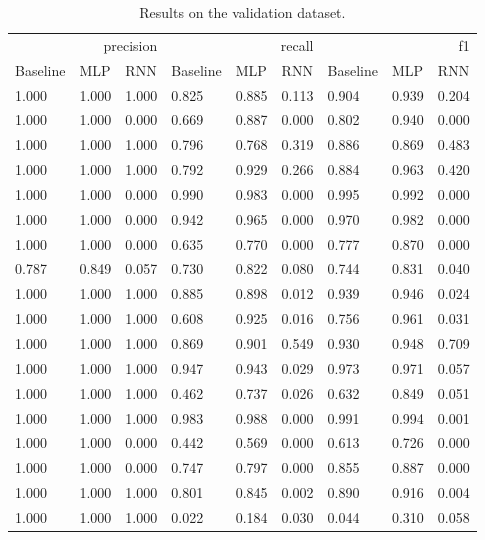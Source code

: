 \begin{table}
\caption{Results on the validation dataset.}
\label{tab::ex_2_valid}
\begin{tabular}{|l||l||l||l||l||l||l||l||l|}
\toprule
\multicolumn{3}{r}{precision} & \multicolumn{3}{r}{recall} & \multicolumn{3}{r}{f1} \\
Baseline & MLP & RNN & Baseline & MLP & RNN & Baseline & MLP & RNN \\
\midrule
1.000 & 1.000 & 1.000 & 0.825 & 0.885 & 0.113 & 0.904 & 0.939 & 0.204 \\
1.000 & 1.000 & 0.000 & 0.669 & 0.887 & 0.000 & 0.802 & 0.940 & 0.000 \\
1.000 & 1.000 & 1.000 & 0.796 & 0.768 & 0.319 & 0.886 & 0.869 & 0.483 \\
1.000 & 1.000 & 1.000 & 0.792 & 0.929 & 0.266 & 0.884 & 0.963 & 0.420 \\
1.000 & 1.000 & 0.000 & 0.990 & 0.983 & 0.000 & 0.995 & 0.992 & 0.000 \\
1.000 & 1.000 & 0.000 & 0.942 & 0.965 & 0.000 & 0.970 & 0.982 & 0.000 \\
1.000 & 1.000 & 0.000 & 0.635 & 0.770 & 0.000 & 0.777 & 0.870 & 0.000 \\
0.787 & 0.849 & 0.057 & 0.730 & 0.822 & 0.080 & 0.744 & 0.831 & 0.040 \\
1.000 & 1.000 & 1.000 & 0.885 & 0.898 & 0.012 & 0.939 & 0.946 & 0.024 \\
1.000 & 1.000 & 1.000 & 0.608 & 0.925 & 0.016 & 0.756 & 0.961 & 0.031 \\
1.000 & 1.000 & 1.000 & 0.869 & 0.901 & 0.549 & 0.930 & 0.948 & 0.709 \\
1.000 & 1.000 & 1.000 & 0.947 & 0.943 & 0.029 & 0.973 & 0.971 & 0.057 \\
1.000 & 1.000 & 1.000 & 0.462 & 0.737 & 0.026 & 0.632 & 0.849 & 0.051 \\
1.000 & 1.000 & 1.000 & 0.983 & 0.988 & 0.000 & 0.991 & 0.994 & 0.001 \\
1.000 & 1.000 & 0.000 & 0.442 & 0.569 & 0.000 & 0.613 & 0.726 & 0.000 \\
1.000 & 1.000 & 0.000 & 0.747 & 0.797 & 0.000 & 0.855 & 0.887 & 0.000 \\
1.000 & 1.000 & 1.000 & 0.801 & 0.845 & 0.002 & 0.890 & 0.916 & 0.004 \\
1.000 & 1.000 & 1.000 & 0.022 & 0.184 & 0.030 & 0.044 & 0.310 & 0.058 \\
\bottomrule
\end{tabular}
\end{table}
